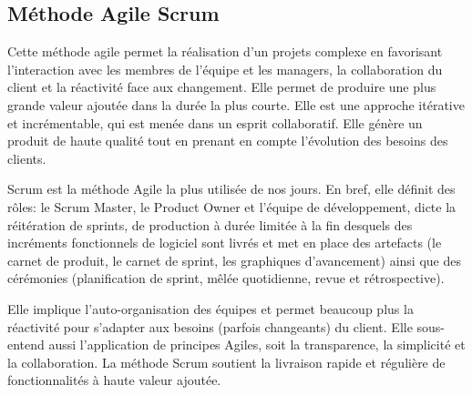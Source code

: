 \subsection{Méthode Agile Scrum}

 Cette méthode agile  permet la réalisation d'un projets complexe en favorisant l'interaction avec les membres de l'équipe et les managers, la collaboration du client et la réactivité face aux changement. Elle permet de produire une plus grande 
 valeur ajoutée dans la durée la plus  courte. Elle est une approche itérative et incrémentable, qui est menée dans un esprit collaboratif. Elle génère un produit de haute qualité tout en prenant en compte l’évolution des besoins des clients.


Scrum est la méthode Agile la plus utilisée de nos jours. En bref, elle définit des rôles: le Scrum Master, le Product Owner et l’équipe de développement, dicte la réitération de sprints, de production à durée limitée à la fin desquels des incréments fonctionnels de logiciel sont livrés et met en place des artefacts (le carnet de produit, le carnet de sprint, les graphiques d’avancement) ainsi que des cérémonies (planification de sprint, mêlée quotidienne, revue et rétrospective).

Elle implique l’auto-organisation des équipes et permet beaucoup plus la réactivité pour s’adapter aux besoins (parfois changeants) du client. Elle sous-entend aussi l’application de principes Agiles, soit la transparence, la simplicité et la collaboration.
La méthode Scrum soutient la livraison rapide et régulière de fonctionnalités à haute valeur ajoutée.









